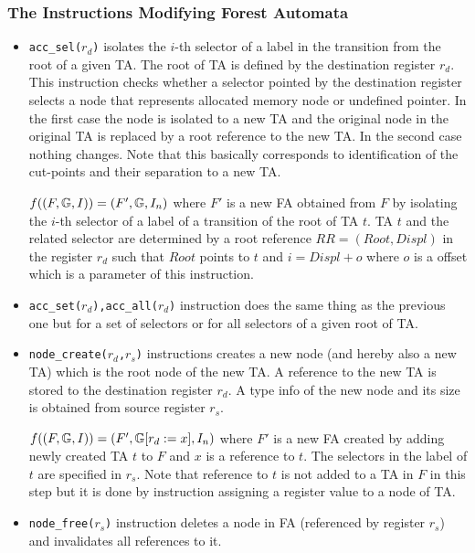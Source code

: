 \subsubsection{The Instructions Modifying Forest Automata}
\begin{itemize}
	\item {\tt acc\_sel($r_d$)} isolates the $i$-th selector of a label
		in the transition from the root of a given TA.
		The root of TA is defined by the destination register $r_d$.
		This instruction checks whether a selector pointed by the destination register
		selects a node that represents allocated memory node or undefined pointer.
		In the first case the node is isolated to a new TA and the original node in the
		original TA is replaced by a root reference to the new TA.
		In the second case nothing changes.
		Note that this basically corresponds to identification of the cut-points
		and their separation to a new TA.
		
		$f((F, \mathbb{G}, I)) = (F', \mathbb{G}, I_n)$
		where $F'$ is a new FA obtained from $F$ by isolating
		the $i$-th selector of a label of a transition of the root of TA $t$.
		TA $t$ and the related selector are determined by a root reference $RR=(Root, Displ)$
		in the register $r_d$ such that $Root$ points to $t$ and $i=Displ+o$
		where $o$ is a offset which is a parameter of this instruction.

	\item {\tt acc\_set($r_d$),acc\_all($r_d$)} instruction does the same thing as the previous one
		but for a set of selectors or for all selectors of a given root of TA.
	
	\item {\tt node\_create($r_d$,$r_s$)} instructions creates a new node
		(and hereby also a new TA) which is the root node of the new TA.
		A reference to the new TA is stored to the destination register $r_d$.
		A type info of the new node and its size is obtained from source
		register $r_s$.
		
		$f((F, \mathbb{G}, I)) = (F', 
		\mathbb{G} [
			r_{d} := x], I_n)$
		where $F'$ is a new FA created by adding newly created TA $t$ to $F$
		and $x$ is a reference to $t$.
		The selectors in the label of $t$ are specified in $r_s$. 
		Note that reference to $t$ is not added to a TA in $F$ in this step
		but it is done by instruction assigning a register value to a
		node of TA.
	
	\item {\tt node\_free($r_s$)} instruction deletes a node in FA (referenced by register $r_s$) and
		invalidates all references to it.
		

\end{itemize}
